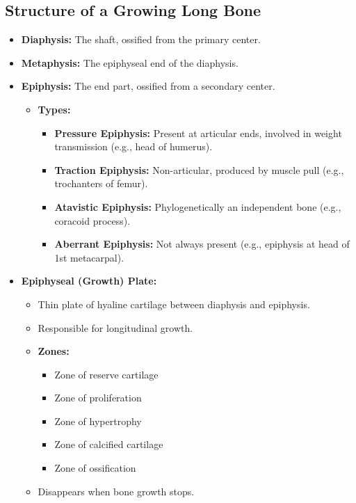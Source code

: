 \documentclass[11pt]{article}
\begin{document}
\subsection{Structure of a Growing Long Bone}
\begin{itemize}
    \item \textbf{Diaphysis:} The shaft, ossified from the primary center.
    \item \textbf{Metaphysis:} The epiphyseal end of the diaphysis.
    \item \textbf{Epiphysis:} The end part, ossified from a secondary center.
    \begin{itemize}
        \item \textbf{Types:}
        \begin{itemize}
            \item \textbf{Pressure Epiphysis:} Present at articular ends, involved in weight transmission (e.g., head of humerus).
            \item \textbf{Traction Epiphysis:} Non-articular, produced by muscle pull (e.g., trochanters of femur).
            \item \textbf{Atavistic Epiphysis:} Phylogenetically an independent bone (e.g., coracoid process).
            \item \textbf{Aberrant Epiphysis:} Not always present (e.g., epiphysis at head of 1st metacarpal).
        \end{itemize}
    \end{itemize}
    \item \textbf{Epiphyseal (Growth) Plate:}
    \begin{itemize}
        \item Thin plate of hyaline cartilage between diaphysis and epiphysis.
        \item Responsible for longitudinal growth.
        \item \textbf{Zones:}
        \begin{itemize}
            \item Zone of reserve cartilage
            \item Zone of proliferation
            \item Zone of hypertrophy
            \item Zone of calcified cartilage
            \item Zone of ossification
        \end{itemize}
        \item Disappears when bone growth stops.
    \end{itemize}
\end{itemize}
\end{document}
